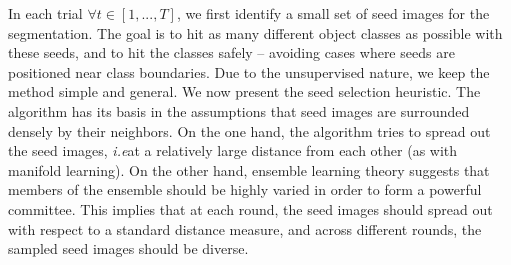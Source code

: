 \documentclass{bmvc2k}
\def\ie{\emph{i.e}\bmvaOneDot}
\begin{document}
In each trial $\forall t \in [1,...,T]$, we first identify a 
small set of seed images for the segmentation. The goal is to hit as 
many different object classes as possible with these seeds, and to hit the classes safely -- avoiding cases where seeds are
positioned near class boundaries.
Due to the unsupervised nature, we keep the method simple and general. 
We now present the seed selection heuristic.
The algorithm has its basis in the assumptions that seed images 
are surrounded densely by their neighbors.  
On the one hand, the algorithm tries to spread out the seed images, 
\ie at a relatively large distance from each other (as with manifold 
learning). On the other hand, ensemble learning theory suggests that 
members of the ensemble should be highly varied in order to form a 
powerful committee. This implies that at each round, the seed
images should spread out with respect to a standard distance
measure, and across different rounds, the sampled seed images
should be diverse. 



\end{document}
